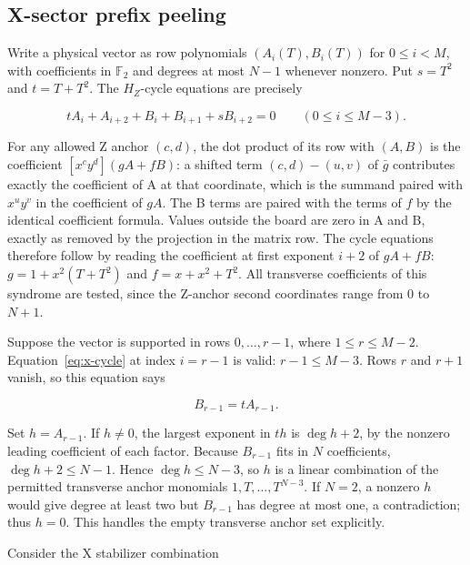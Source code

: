\documentclass{article}
\begin{document}
\subsection{X-sector prefix peeling}\label{x-sector-prefix-peeling}

Write a physical vector as row polynomials \((A_i(T),B_i(T))\) for
\(0\le i<M\), with coefficients in \(\mathbb F_2\) and degrees at most
\(N-1\) whenever nonzero. Put \(s=T^2\) and \(t=T+T^2\). The
\(H_Z\)-cycle equations are precisely

\begin{equation}\label{eq:x-cycle}
 tA_i+A_{i+2}+B_i+B_{i+1}+sB_{i+2}=0\qquad(0\le i\le M-3).
\end{equation}

For any allowed Z anchor \((c,d)\), the dot product of its row with
\((A,B)\) is the coefficient \([x^cy^d](gA+fB)\): a shifted term
\((c,d)-(u,v)\) of \(\bar g\) contributes exactly the coefficient
of A at that coordinate, which is the summand paired with \(x^uy^v\)
in the coefficient of \(gA\). The B terms are paired with the terms of
\(f\) by the identical coefficient formula. Values outside the board
are zero in A and B, exactly as removed by the projection in the matrix row.
The cycle equations therefore follow by reading the coefficient at first exponent
\(i+2\) of \(gA+fB\): \(g=1+x^2(T+T^2)\) and \(f=x+x^2+T^2\). All
transverse coefficients of this syndrome are tested, since the Z-anchor
second coordinates range from \(0\) to \(N+1\).

Suppose the vector is supported in rows \(0,\ldots,r-1\), where
\(1\le r\le M-2\). Equation~\eqref{eq:x-cycle} at index \(i=r-1\) is valid:
\(r-1\le M-3\). Rows \(r\) and \(r+1\) vanish, so this equation says

\begin{equation}
 B_{r-1}=tA_{r-1}.
\end{equation}

Set \(h=A_{r-1}\). If \(h\ne0\), the largest exponent in \(th\) is
\(\deg h+2\), by the nonzero leading coefficient of each factor. Because
\(B_{r-1}\) fits in \(N\) coefficients, \(\deg h+2\le N-1\). Hence
\(\deg h\le N-3\), so \(h\) is a linear combination of the permitted
transverse anchor monomials \(1,T,\ldots,T^{N-3}\). If \(N=2\), a
nonzero \(h\) would give degree at least two but \(B_{r-1}\) has degree
at most one, a contradiction; thus \(h=0\). This handles the empty
transverse anchor set explicitly.

Consider the X stabilizer combination
\end{document}
